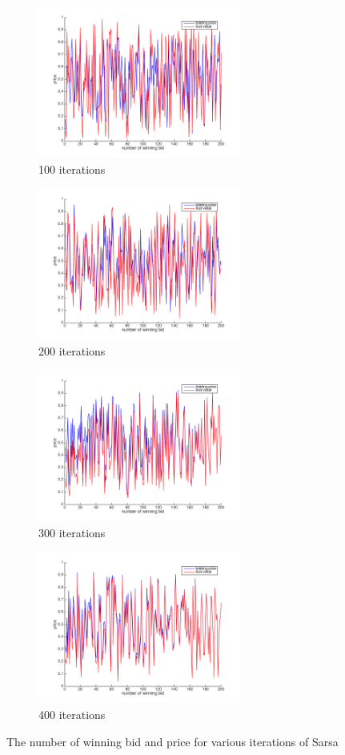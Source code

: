\begin{figure}[htbp]

\begin{subfigure}{0.5\textwidth}
\includegraphics[width=0.9\linewidth, height=5cm]{S100.png}
\caption{100 iterations}
\label{fig:S100}
\end{subfigure}
\begin{subfigure}{0.5\textwidth}
\includegraphics[width=0.9\linewidth, height=5cm]{S200.png}
\caption{200 iterations}
\label{fig:S200}
\end{subfigure}
\begin{subfigure}{0.5\textwidth}
\includegraphics[width=0.9\linewidth, height=5cm]{S300.png}
\caption{300 iterations}
\label{fig:S300}
\end{subfigure}
\begin{subfigure}{0.5\textwidth}
\includegraphics[width=0.9\linewidth, height=5cm]{S400.png}
\caption{400 iterations}
\label{fig:S400}
\end{subfigure}

\caption{The number of winning bid and price for various iterations of Sarsa}
\label{fig:S}
\end{figure}





